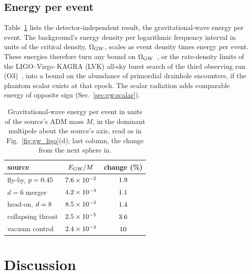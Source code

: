 \documentclass[twocolumn,floatfix,aps,prd,superscriptaddress,nofootinbib,showkeys]{revtex4-2}
\begin{document}
\subsection{Energy per event}
\label{sec:ligo:burst}

Table~\ref{tab:energies} lists the detector-independent result, the gravitational-wave energy per event. The background's energy density per logarithmic frequency interval in units of the critical density, $\Omega_{\rm GW}$, scales as event density times energy per event. These energies therefore turn any bound on $\Omega_{\rm GW}$~\cite{lvk2021,pagano2016}, or the rate-density limits of the LIGO--Virgo--KAGRA (LVK) all-sky burst search of the third observing run (O3)~\cite{lvk2021burst}, into a bound on the abundance of primordial drainhole encounters, if the phantom scalar exists at that epoch. The scalar radiation adds comparable energy of opposite sign (Sec.~\ref{sec:gw:scalar}).

\begin{table}[t]
\caption{Gravitational-wave energy per event in units of the source's ADM mass $M$, in the dominant multipole about the source's axis, read as in Fig.~\ref{fig:gw_ligo}(d); last column, the change from the next sphere in.}
\label{tab:energies}
\begin{ruledtabular}
\begin{tabular}{lcc}
source & $E_{\rm GW}/M$ & change (\%) \\
\hline
fly-by, $p=0.45$ & $7.6\times10^{-2}$ & $1.9$ \\
$d=6$ merger & $4.2\times10^{-3}$ & $1.1$ \\
head-on, $d=8$ & $8.5\times10^{-3}$ & $1.4$ \\
collapsing throat & $2.5\times10^{-5}$ & $3.6$ \\
vacuum control & $2.4\times10^{-3}$ & $10$ \\
\end{tabular}
\end{ruledtabular}
\end{table}

\section{Discussion}
\label{sec:discussion}
\end{document}
